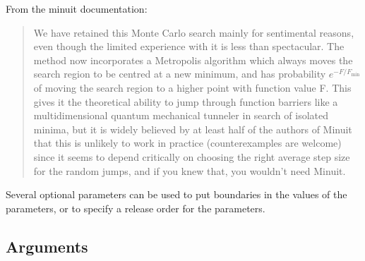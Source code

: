 From the minuit documentation:
\begin{quotation}
  We have retained this Monte Carlo search mainly for sentimental
  reasons, even though the limited 
  experience with it is less than spectacular. The method now
  incorporates a Metropolis algorithm which always moves the search
  region to be centred at a new minimum, and has probability
  $e^{-F/F_\text{min}}$ of moving the search region to a higher point
  with function value F. This gives it the theoretical ability to jump
  through function barriers like a multidimensional quantum mechanical
  tunneler in search of isolated minima, but it is widely believed by
  at least half of the authors of Minuit that this is unlikely to work
  in practice (counterexamples are welcome) since it seems to depend
  critically on choosing the right average step size for the random
  jumps, and if you knew that, you wouldn't need Minuit. 
\end{quotation}

Several optional parameters can be used to put boundaries in the
values of the parameters, or to specify a release order for the
parameters. 

\subsection{Arguments}

